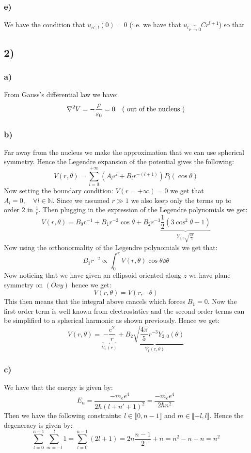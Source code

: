 \documentclass[10pt,a4paper]{book}
\begin{document}
\subsubsection*{e)}
We have the condition that $u_{n',l}(0)=0$ (i.e. we have that $u_l\underset{r\to0}{\sim}Cr^{l+1}$) so that 


\subsection*{2)}

\subsubsection{a)}

From Gauss's differential law we have:
\[
\laplacian V = -\frac{\rho}{\varepsilon_0} = 0 \quad (\text{ out of the nucleus } )
\]

\subsubsection*{b)}
Far away from the nucleus we make the approximation that we can use spherical symmetry. Hence the Legendre expansion of the potential gives the following:
\[
V(r, \theta) = \sum_{l = 0}^{+\infty} (A_l r^l + B_l r^{-(l+1)}) P_l(\cos\theta)
\]
Now setting the boundary condition: $V(r = +\infty) = 0$ we get that $A_l = 0, \quad \forall l \in \mathbb{N}$. Since we assumed $r \gg 1$ we also keep only the terms up to order $2$ in $\frac{1}{r}$. Then plugging in the expression of the Legendre polynomials we get:
\[
V(r, \theta) = B_0 r^{-1} + B_1 r^{-2} \cos \theta + B_2 r^{-3} \underbrace{\frac{1}{2} (3 \cos^2\theta - 1)}_{Y_{2,0} \sqrt{\frac{4 \pi}{5}}}
\]
Now using the orthonormality of the Legendre polynomials we get that:
\[
B_1 r^{-2} \propto \int_{0}^{\pi} V(r, \theta) \cos \theta \dd \theta
\]
Now noticing that we have given an ellipsoid oriented along $z$ we have plane symmetry on $(Oxy)$ hence we get:
\[
V(r, \theta) = V(r, -\theta)
\]
This then means that the integral above cancels which forces $B_1 = 0$. Now the first order term is well known from electrostatics and the second order terms can be simplified to a spherical harmonic as shown previously. Hence we get:
\[
V(r, \theta) = \underbrace{-\frac{e^2}{r}}_{V_0(r)} + \underbrace{B_2 \sqrt{\frac{4\pi}{5}} r^{-3} Y_{2,0}(\theta)}_{V_1(r, \theta)} 
\]

\subsubsection*{c)}
We have that the energy is given by:
\[
E_n = \frac{-m_e e^4}{2\hbar (l + n' + 1)^2} = \frac{-m_e e^4}{2\hbar n^2}
\]
Then we have the following constraints: $ l \in \llbracket 0, n-1 \rrbracket$ and $ m \in \llbracket -l , l \rrbracket$. Hence the degeneracy is given by:
\[
\sum_{l = 0}^{n - 1} \sum_{m = - l}^l 1 = \sum_{l = 0}^{n - 1} (2l + 1) = 2 n\frac{n-1}{2} + n = n^2 - n + n = n^2 
\]
\end{document}
